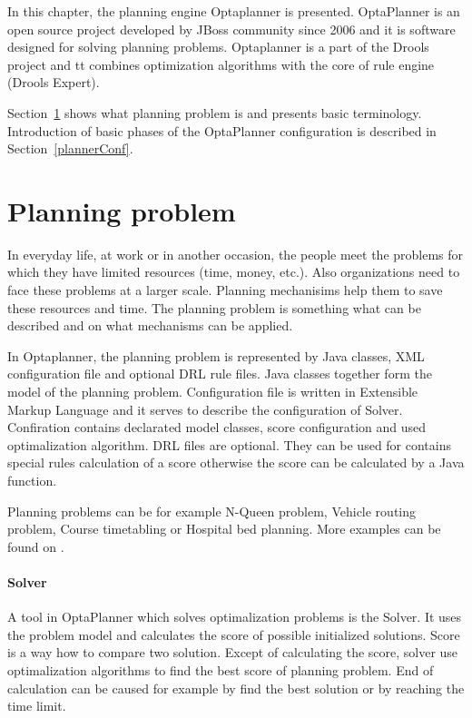 In this chapter, the planning engine Optaplanner is presented. OptaPlanner is an open source project developed by JBoss community since 2006 and it is software designed for solving planning problems. Optaplanner is a part of the Drools project and tt combines optimization algorithms with the core of rule engine (Drools Expert).

Section~\ref{planningProblem} shows what planning problem is and presents basic terminology. Introduction of basic phases of the OptaPlanner configuration is described in Section~\ref{plannerConf}. 

\section{Planning problem}\label{planningProblem}
In everyday life, at work or in another occasion, the people meet the problems for which they have limited resources (time, money, etc.). Also organizations need to face these problems at a larger scale. Planning mechanisims help them to save these resources and time. The planning problem is something what can be described and on what mechanisms can be applied.

In Optaplanner, the planning problem is represented by Java classes, XML configuration file and optional DRL rule files. Java classes together form the model of the planning problem. Configuration file is written in Extensible Markup Language and it serves to describe the configuration of Solver. Confiration contains declarated model classes, score configuration and used optimalization algorithm. DRL files are optional. They can be used for contains special rules calculation of a score otherwise the score can be calculated by a Java function.

Planning problems can be for example N-Queen problem, Vehicle routing problem, Course timetabling or Hospital bed planning. More examples can be found on \cite{}.

\paragraph{Solver}
A tool in OptaPlanner which solves optimalization problems is the Solver. It uses the problem model and calculates the score of possible initialized solutions. Score is a way how to compare two solution. Except of calculating the score, solver use optimalization algorithms to find the best score of planning problem. End of calculation can be caused for example by find the best solution or by reaching the time limit.

